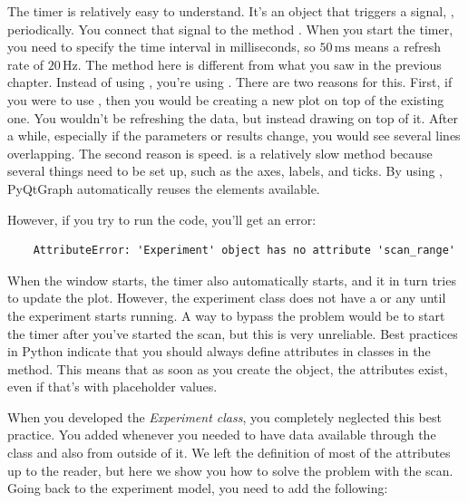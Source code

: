 The timer is relatively easy to understand. It's an object that triggers a signal, , periodically. You connect that signal to the method . When you start the timer, you need to specify the time interval in milliseconds, so $50\,\textrm{ms}$ means a refresh rate of $20\,\textrm{Hz}$. The  method here is different from what you saw in the previous chapter. Instead of using , you're using . There are two reasons for this. First, if you were to use , then you would be creating a new plot on top of the existing one. You wouldn't be refreshing the data, but instead drawing on top of it. After a while, especially if the parameters or results change, you would see several lines overlapping. The second reason is speed.  is a relatively slow method because several things need to be set up, such as the axes, labels, and ticks. By using , PyQtGraph automatically reuses the elements available.

However, if you try to run the code, you'll get an error:

\begin{verbatim}
    AttributeError: 'Experiment' object has no attribute 'scan_range'
\end{verbatim}


When the window starts, the timer also automatically starts, and it in turn tries to update the plot. However, the experiment class does not have a  or any  until the experiment starts running. A way to bypass the problem would be to start the timer after you've started the scan, but this is very unreliable. Best practices in Python indicate that you should always define attributes in classes in the  method. This means that as soon as you create the object, the attributes exist, even if that's with placeholder values.

When you developed the \emph{Experiment class}, you completely neglected this best practice. You added  whenever you needed to have data available through the class and also from outside of it. We left the definition of most of the attributes up to the reader, but here we show you how to solve the problem with the scan. Going back to the experiment model, you need to add the following:

